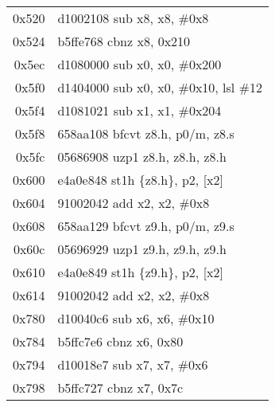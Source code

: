 \documentclass[11pt,a4paper]{article}
\begin{document}
\begin{longtable}{|r|l|}

\rowcolor{address} 0x520 & d1002108 \quad sub x8, x8, \#0x8 \\
\rowcolor{control} 0x524 & b5ffe768 \quad cbnz x8, 0x210 \\


\rowcolor{address} 0x5ec & d1080000 \quad sub x0, x0, \#0x200 \\
\rowcolor{address} 0x5f0 & d1404000 \quad sub x0, x0, \#0x10, lsl \#12 \\
\rowcolor{address} 0x5f4 & d1081021 \quad sub x1, x1, \#0x204 \\
\rowcolor{conversion} 0x5f8 & 658aa108 \quad bfcvt z8.h, p0/m, z8.s \\
\rowcolor{conversion} 0x5fc & 05686908 \quad uzp1 z8.h, z8.h, z8.h \\
\rowcolor{storage} 0x600 & e4a0e848 \quad st1h \{z8.h\}, p2, [x2] \\
\rowcolor{address} 0x604 & 91002042 \quad add x2, x2, \#0x8 \\
\rowcolor{conversion} 0x608 & 658aa129 \quad bfcvt z9.h, p0/m, z9.s \\
\rowcolor{conversion} 0x60c & 05696929 \quad uzp1 z9.h, z9.h, z9.h \\
\rowcolor{storage} 0x610 & e4a0e849 \quad st1h \{z9.h\}, p2, [x2] \\
\rowcolor{address} 0x614 & 91002042 \quad add x2, x2, \#0x8 \\


\rowcolor{address} 0x780 & d10040c6 \quad sub x6, x6, \#0x10 \\
\rowcolor{control} 0x784 & b5ffc7e6 \quad cbnz x6, 0x80 \\

\rowcolor{address} 0x794 & d10018e7 \quad sub x7, x7, \#0x6 \\
\rowcolor{control} 0x798 & b5ffc727 \quad cbnz x7, 0x7c \\


\end{longtable}
\end{document}
